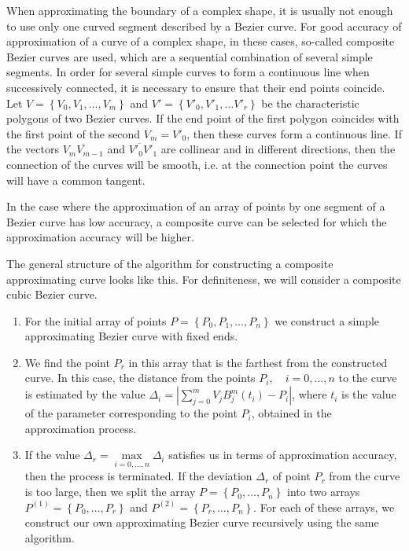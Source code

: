 \documentclass[12pt]{article}
\begin{document}
 When approximating the boundary of a complex shape, it is usually not enough to use only one curved segment described by a Bezier curve.
 For good accuracy of approximation of a curve of a complex shape, in these cases,
 so-called composite Bezier curves are used, which are a sequential combination of several simple segments.
 In order for several simple curves to form a continuous line when successively connected,
 it is necessary to ensure that their end points coincide.
 Let $V=\left\{V_{0} ,V_{1} ,\ldots ,V_{m} \right\}$ and $V'=\left\{V'_{0} ,V'_{1} ,\ldots V'_{r} \right\}$
 be the characteristic polygons of two Bezier curves. If the end point of the first polygon coincides
 with the first point of the second $V_{m} =V'_{0} $, then these curves form a continuous line.
 If the vectors $\overline{V_{m} V_{m-1} }$ and $\overline{V'_{0} V}'_{1} $ are collinear and in different directions,
 then the connection of the curves will be smooth, i.e. at the connection point the curves will have a common tangent.
  
 In the case where the approximation of an array of points by one segment of a Bezier curve has low accuracy,
 a composite curve can be selected for which the approximation accuracy will be higher.
 
 The general structure of the algorithm for constructing a composite approximating curve looks like this.
 For definiteness, we will consider a composite cubic Bezier curve.
 
 \begin{enumerate}
\item For the initial array of points $P=\left\{P_{0} ,P_{1} ,\ldots ,P_{n} \right\}$
we construct a simple approximating Bezier curve with fixed ends.
  
\item We find the point $P_{r} $ in this array that is the farthest from the constructed curve.
In this case, the distance from the points $P_{i} ,\quad i=0,\ldots ,n$ to the curve is estimated by the value
$\Delta _{i} =\left|\sum _{j=0}^{m}V_{j} B_{j}^{m} \left(t_{i} \right)-P_{i} \right|$,
where $t_{i} $ is the value of the parameter corresponding to the point $P_{i} $, obtained in the approximation process.
 
\item If the value $\Delta _{r} =\mathop{\max }\limits_{i=0,\ldots ,n} \Delta _{i} $
satisfies us in terms of approximation accuracy, then the process is terminated.
If the deviation $\Delta _{r} $ of point $P_{r} $ from the curve is too large,
then we split the array $P=\left\{P_{0} ,\ldots ,P_{n} \right\}$ into two arrays
$P^{(1)} =\left\{P_{0} ,\ldots ,P_{r} \right\}$ and $P^{(2)} =\left\{P_{r} ,\ldots ,P{}_{n} \right\}$.
For each of these arrays, we construct our own approximating Bezier curve recursively using the same algorithm.

\end{enumerate}
 
\end{document}
